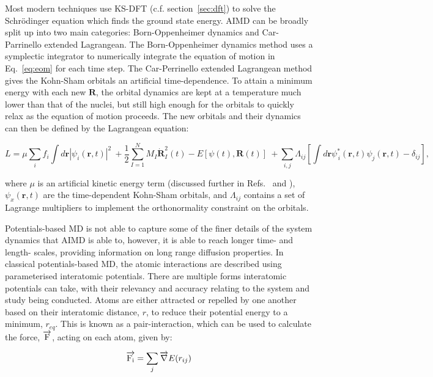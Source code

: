 \documentclass[../main.tex]{subfiles}
\begin{document}
Most modern techniques use KS-DFT (c.f. section~\ref{sec:dft}) to solve the Schr\"{o}dinger equation which finds the ground state energy. AIMD can be broadly split up into two main categories: Born-Oppenheimer dynamics and Car-Parrinello extended Lagrangean. The Born-Oppenheimer dynamics method uses a symplectic integrator to numerically integrate the equation of motion in Eq.~\ref{eq:eom} for each time step. The Car-Perrinello extended Lagrangean method gives the Kohn-Sham orbitals an artificial time-dependence. To attain a minimum energy with each new $\textbf{R}$, the orbital dynamics are kept at a temperature much lower than that of the nuclei, but still high enough for the orbitals to quickly relax as the equation of motion proceeds. The new orbitals and their dynamics can then be defined by the Lagrangean equation:\cite{Car1985}

\begin{equation}
    L=\mu \sum_i f_i \int d\textbf{r}|\psi_i(\textbf{r},t)|^2 \
    +\frac{1}{2}\sum^N_{I=1} M_I\dot{\textbf{R}}^2_I (t)- E\left[{\psi(t)}, \textbf{R}(t)\right] \
    +\sum_{i,j} \Lambda_{ij}\left[\int d\textbf{r}\psi^*_{\,i}(\textbf{r},t)\psi_j(\textbf{r}, t)- \delta_{ij}\right],
\end{equation}

where $\mu$ is an artificial kinetic energy term (discussed further in Refs.~ and ), $\psi_x(\textbf{r},t)$ are the time-dependent Kohn-Sham orbitals, and $\Lambda_{ij}$ contains a set of Lagrange multipliers to implement the orthonormality constraint on the orbitals. 

Potentials-based MD is not able to capture some of the finer details of the system dynamics that AIMD is able to, however, it is able to reach longer time- and length- scales, providing information on long range diffusion properties. In classical potentials-based MD, the atomic interactions are described using parameterised interatomic potentials. There are multiple forms interatomic potentials can take, with their relevancy and accuracy relating to the system and study being conducted. Atoms are either attracted or repelled by one another based on their interatomic distance, $r$, to reduce their potential energy to a minimum, $r_{eq}$. This is known as a pair-interaction, which can be used to calculate the force, $\overrightarrow{\rm F}$, acting on each atom, given by:

\begin{equation}
    \overrightarrow{\rm F_i} = \sum_j {\overrightarrow{\nabla}}E(r_{ij})
\end{equation}
\end{document}
